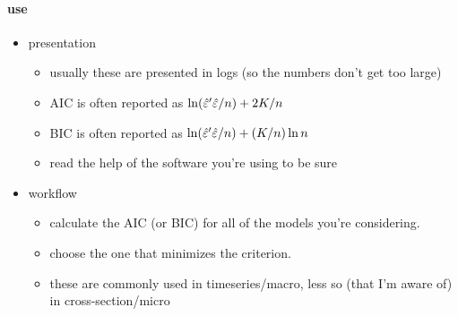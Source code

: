 \paragraph{use}
\begin{itemize}
\item presentation
\begin{itemize}
\item usually these are presented in logs (so the numbers don't get
           too large)
\item AIC is often reported as $\ln(\hat{\varepsilon}'\hat{\varepsilon}/n) + 2K/n$
\item BIC is often reported as $\ln(\hat{\varepsilon}'\hat{\varepsilon}/n) + (K/n) \ln n$
\item read the help of the software you're using to be sure
\end{itemize}
\item workflow
\begin{itemize}
\item calculate the AIC (or BIC) for all of the models you're considering.
\item choose the one that minimizes the criterion.
\item these are commonly used in timeseries/macro, less so (that
           I'm aware of) in cross-section/micro
\end{itemize}
\end{itemize}

